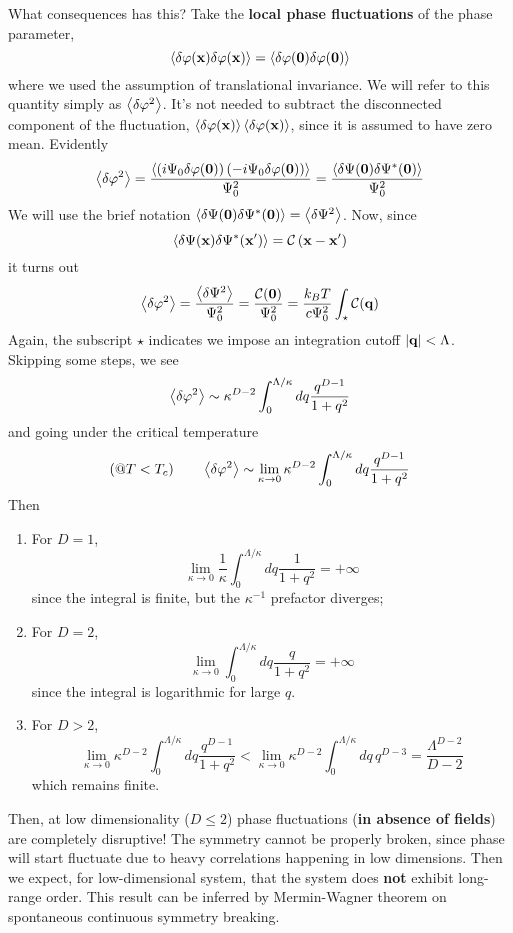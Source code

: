What consequences has this? Take the \textbf{local phase fluctuations} of the phase parameter,
\[
    \ev{\delta\varphi(\mathbf{x})\delta\varphi(\mathbf{x})} = \ev{\delta\varphi(\mathbf{0})\delta\varphi(\mathbf{0})}
\]
where we used the assumption of translational invariance. We will refer to this quantity simply as $\ev{\delta\varphi^2}$. It's not needed to subtract the disconnected component of the fluctuation, $\ev{\delta\varphi(\mathbf{x})}\ev{\delta\varphi(\mathbf{x})}$, since it is assumed to have zero mean. Evidently
\[
    \ev{\delta\varphi^2} =  \frac{\ev{ \lrR{i\Psi_0 \delta\varphi(\mathbf{0})} \lrR{-i\Psi_0 \delta\varphi(\mathbf{0})} }}{\Psi_0^2} =  \frac{\ev{ \delta\Psi(\mathbf{0}) \delta\Psi^*(\mathbf{0}) }}{\Psi_0^2}
\]
We will use the brief notation $\ev{ \delta\Psi(\mathbf{0}) \delta\Psi^*(\mathbf{0}) } = \ev{ \delta\Psi^2 }$. Now, since
\[
    \ev{\delta\Psi(\mathbf{x}) \delta\Psi^*(\mathbf{x}')} = \mathcal{C} \lrR{ \mathbf{x} - \mathbf{x}' }
\]
it turns out
\[
    \ev{\delta\varphi^2} = \frac{\ev{\delta\Psi^2}}{\Psi_0^2} = \frac{\mathcal{C} (\mathbf{0})}{\Psi_0^2} = \frac{k_B T}{c \Psi_0^2} \int_\star \mathcal{C} (\mathbf{q})
\]
Again, the subscript $\star$ indicates we impose an integration cutoff $\abs{\mathbf{q}} < \Lambda$. Skipping some steps, we see
\[
    \ev{\delta\varphi^2} \sim \kappa^{D-2} \int_0^{\Lambda/\kappa} dq \frac{q^{D-1}}{1 + q^2}
\]
and going under the critical temperature
\[
    (@T<T_c) \qquad \ev{\delta\varphi^2} \sim \lim_{\kappa\to0} \kappa^{D-2} \int_0^{\Lambda/\kappa} dq \frac{q^{D-1}}{1 + q^2}
\]
Then
\begin{enumerate}
    \item For $D=1$,
    \[
        \lim_{\kappa\to0} \frac{1}{\kappa} \int_0^{\Lambda/\kappa} dq \frac{1}{1 + q^2} = +\infty
    \]
    since the integral is finite, but the $\kappa^{-1}$ prefactor diverges;
    \item For $D=2$,
    \[
        \lim_{\kappa\to0} \int_0^{\Lambda/\kappa} dq \frac{q}{1 + q^2} = +\infty
    \]
    since the integral is logarithmic for large $q$.
    \item For $D>2$,
    \[
        \lim_{\kappa\to0} \kappa^{D-2} \int_0^{\Lambda/\kappa} dq \frac{q^{D-1}}{1 + q^2} < \lim_{\kappa\to0} \kappa^{D-2} \int_0^{\Lambda/\kappa} dq \, q^{D-3} = \frac{\Lambda^{D-2}}{D-2}
    \]
    which remains finite.
\end{enumerate}
Then, at low dimensionality ($D\le2$) phase fluctuations (\textbf{in absence of fields}) are completely disruptive! The symmetry cannot be properly broken, since phase will start fluctuate due to heavy correlations happening in low dimensions. Then we expect, for low-dimensional system, that the system does \textbf{not} exhibit long-range order. This result can be inferred by Mermin-Wagner theorem on spontaneous continuous symmetry breaking.

